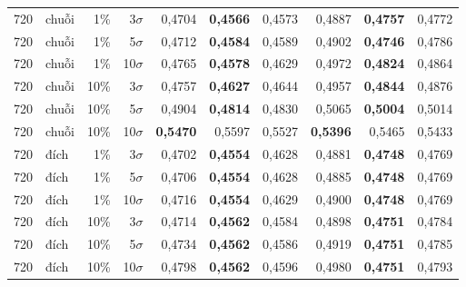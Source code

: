 \begin{tabular}{@{}r l r r rrr rrr@{}}
720 & chuỗi & 1\% & 3$\sigma$ & 0{,}4704 & \textbf{0{,}4566} & 0{,}4573 & 0{,}4887 & \textbf{0{,}4757} & 0{,}4772 \\
720 & chuỗi & 1\% & 5$\sigma$ & 0{,}4712 & \textbf{0{,}4584} & 0{,}4589 & 0{,}4902 & \textbf{0{,}4746} & 0{,}4786 \\
720 & chuỗi & 1\% & 10$\sigma$ & 0{,}4765 & \textbf{0{,}4578} & 0{,}4629 & 0{,}4972 & \textbf{0{,}4824} & 0{,}4864 \\
720 & chuỗi & 10\% & 3$\sigma$ & 0{,}4757 & \textbf{0{,}4627} & 0{,}4644 & 0{,}4957 & \textbf{0{,}4844} & 0{,}4876 \\
720 & chuỗi & 10\% & 5$\sigma$ & 0{,}4904 & \textbf{0{,}4814} & 0{,}4830 & 0{,}5065 & \textbf{0{,}5004} & 0{,}5014 \\
720 & chuỗi & 10\% & 10$\sigma$ & \textbf{0{,}5470} & 0{,}5597 & 0{,}5527 & \textbf{0{,}5396} & 0{,}5465 & 0{,}5433 \\
720 & đích & 1\% & 3$\sigma$ & 0{,}4702 & \textbf{0{,}4554} & 0{,}4628 & 0{,}4881 & \textbf{0{,}4748} & 0{,}4769 \\
720 & đích & 1\% & 5$\sigma$ & 0{,}4706 & \textbf{0{,}4554} & 0{,}4628 & 0{,}4885 & \textbf{0{,}4748} & 0{,}4769 \\
720 & đích & 1\% & 10$\sigma$ & 0{,}4716 & \textbf{0{,}4554} & 0{,}4629 & 0{,}4900 & \textbf{0{,}4748} & 0{,}4769 \\
720 & đích & 10\% & 3$\sigma$ & 0{,}4714 & \textbf{0{,}4562} & 0{,}4584 & 0{,}4898 & \textbf{0{,}4751} & 0{,}4784 \\
720 & đích & 10\% & 5$\sigma$ & 0{,}4734 & \textbf{0{,}4562} & 0{,}4586 & 0{,}4919 & \textbf{0{,}4751} & 0{,}4785 \\
720 & đích & 10\% & 10$\sigma$ & 0{,}4798 & \textbf{0{,}4562} & 0{,}4596 & 0{,}4980 & \textbf{0{,}4751} & 0{,}4793 \\
\bottomrule
\end{tabular}
